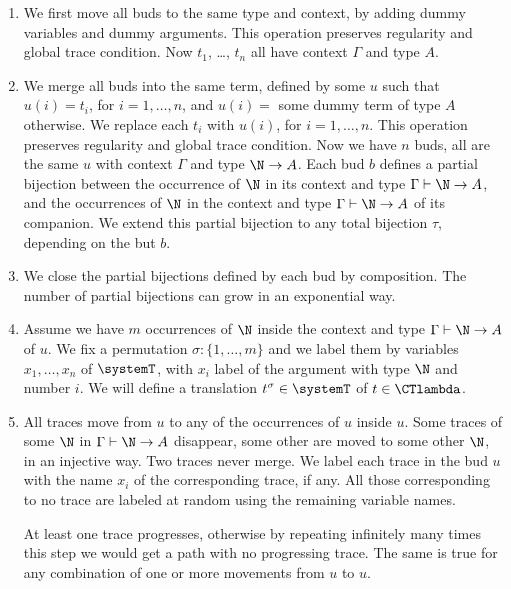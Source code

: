 \begin{enumerate}

\item
We first move all buds to the same type and context, by adding dummy variables and dummy arguments.
This operation preserves regularity and global trace condition.
Now $t_1$, \ldots, $t_n$ all have context $\Gamma$ and type $A$.

\item
We merge all buds into the same term, defined by some $u$ such that $u(i)=t_i$, for $i=1, \ldots, n$,
and $u(i)=$ some dummy term of type $A$ otherwise. We replace each $t_i$ with $u(i)$, 
for $i=1, \ldots, n$.
This operation preserves regularity and global trace condition.
Now we have $n$ buds, all are the same $u$ with context $\Gamma$ and type $\N \rightarrow A$.
Each bud $b$ defines a partial bijection between the occurrence of $\N$ in its context and type
$\Gamma \vdash \N \rightarrow A$, and the occurrences of $\N$ in the context and type
$\Gamma \vdash \N \rightarrow A$ of its companion. 
We extend this partial bijection to any total bijection $\tau$, depending on the but $b$.

\item
We close the partial bijections defined by each bud by composition. The number of partial 
bijections can grow in an exponential  way.

\item
Assume we have $m$ occurrences of $\N$ inside the context and type 
$\Gamma \vdash \N \rightarrow A$ of $u$.
We fix a permutation $\sigma:\{1, \ldots, m\}$ 
and we label them by variables $x_1, \ldots, x_n$ of $\systemT$,
with $x_i$ label of the argument with type $\N$ and number $i$.
We will define a translation $t^\sigma \in \systemT$ of  $t \in \CTlambda$.

\item
All traces move from $u$ to any of the occurrences of $u$ inside $u$. 
Some traces of some $\N$
in $\Gamma \vdash \N \rightarrow A$ disappear, some other are moved to some other $\N$,
in an injective way. Two traces never merge.
We label each trace in the bud $u$ with the name $x_i$ of the corresponding trace, if any.
All those corresponding to no trace are labeled at random using the remaining variable names.

At least one trace progresses, otherwise by repeating infinitely many times this step we would get a
path with no progressing trace. The same is true for any combination of one or more movements
from $u$ to $u$. 


\end{enumerate}
